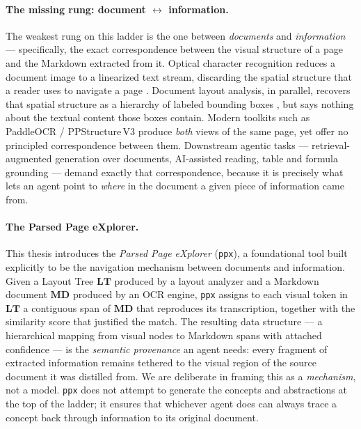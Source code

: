 \documentclass{article}
\theoremstyle{definition}
\newcommand{\LT}{\mathbf{LT}}
\newcommand{\MD}{\mathbf{MD}}
\begin{document}
\paragraph{The missing rung: document $\leftrightarrow$ information.}
The weakest rung on this ladder is the one between \emph{documents}
and \emph{information} --- specifically, the exact correspondence
between the visual structure of a page and the Markdown extracted
from it.  Optical character recognition reduces a document image to
a linearized text stream, discarding the spatial structure that a
reader uses to navigate a page \cite{ieee2025systematic}.  Document
layout analysis, in parallel, recovers that spatial structure as a
hierarchy of labeled bounding boxes
\cite{PPDocLayout, wang2024dlaformer}, but says nothing about the
textual content those boxes contain.  Modern toolkits such as
PaddleOCR / PPStructure\,V3 \cite{PaddleOCR30} produce \emph{both}
views of the same page, yet offer no principled correspondence
between them.  Downstream agentic tasks --- retrieval-augmented
generation over documents, AI-assisted reading, table and formula
grounding --- demand exactly that correspondence, because it is
precisely what lets an agent point to \emph{where} in the document a
given piece of information came from.

\paragraph{The Parsed Page eXplorer.}
This thesis introduces the \emph{Parsed Page eXplorer} (\texttt{ppx}),
a foundational tool built explicitly to be the navigation mechanism
between documents and information.  Given a Layout Tree $\LT$
produced by a layout analyzer and a Markdown document $\MD$ produced
by an OCR engine, \texttt{ppx} assigns to each visual token in $\LT$
a contiguous span of $\MD$ that reproduces its transcription,
together with the similarity score that justified the match.  The
resulting data structure --- a hierarchical mapping from visual nodes
to Markdown spans with attached confidence --- is the \emph{semantic
      provenance} an agent needs: every fragment of extracted
information remains tethered to the visual region of the source
document it was distilled from.  We are deliberate in framing this
as a \emph{mechanism}, not a model.  \texttt{ppx} does not attempt
to generate the concepts and abstractions at the top of the ladder;
it ensures that whichever agent does can always trace a concept back
through information to its original document.
\end{document}
